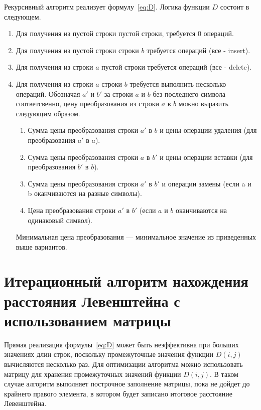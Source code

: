 \documentclass[12pt]{report}
\begin{document}
    Рекурсивный алгоритм реализует формулу~\ref{eq:D}.
    Логика функции $D$ состоит в следующем.
    \begin{enumerate}
        \item Для получения из пустой строки пустой строки, требуется 0 операций.
        \item Для получения из пустой строки строки $b$ требуется  операций (все - insert).
        \item Для получения из строки $a$ пустой строки требуется  операций (все - delete).
        \item Для получения из строки $a$ строки $b$ требуется выполнить несколько операций.
        Обозначая $a'$ и $b'$ за строки $a$ и $b$ без последнего символа соответсвенно, цену преобразования
        из строки $a$ в $b$ можно выразить следующим образом.
        \begin{enumerate}
            \item Сумма цены преобразования строки $a'$ в $b$ и цены операции удаления (для преобразования $a'$ в $a$).
            \item Сумма цены преобразования строки $a$ в $b'$ и цены операции вставки (для преобразования $b'$ в $b$).
            \item Сумма цены преобразования строки $a'$ в $b'$ и операции замены
            (если a и b оканчиваются на разные символы).
            \item Цена преобразования строки $a'$ в $b'$ (если $a$ и $b$ оканчиваются на одинаковый символ).
        \end{enumerate}
        Минимальная цена преобразования --- минимальное значение из приведенных выше вариантов.
    \end{enumerate}


    \section{Итерационный алгоритм нахождения расстояния Левенштейна с использованием матрицы}
    Прямая реализация формулы~\ref{eq:D} может быть неэффективна при больших значениях длин строк,
    поскольку промежуточные значения функции $D(i, j)$ вычисляются несколько раз.
    Для оптимизации алгоритма можно использовать матрицу для хранения промежуточных значений функции $D(i, j)$.
    В таком случае алгоритм выполняет построчное заполнение матрицы, пока не дойдет до крайнего правого элемента,
    в котором будет записано итоговое расстояние Левенштейна.
\end{document}
